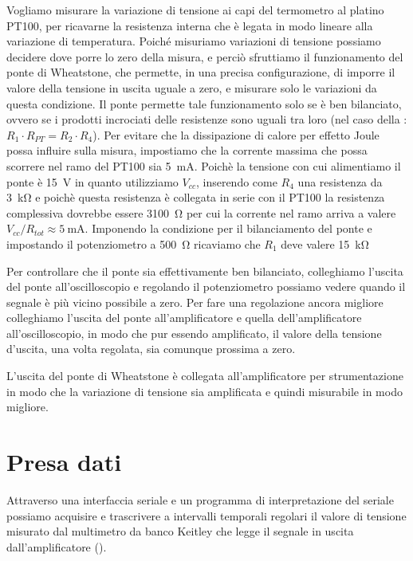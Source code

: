\documentclass[
    rmp,
    reprint, 
    superscriptaddress, 
    altaffilletter, 
    amsmath, 
    amssymb,
    a4paper]{revtex4-2}
\begin{document}
Vogliamo misurare la variazione di tensione ai capi del termometro al platino PT100, per ricavarne la resistenza interna che è legata in modo lineare alla variazione di temperatura. Poiché misuriamo variazioni di tensione possiamo decidere dove porre lo zero della misura, e perciò sfruttiamo il funzionamento del ponte di Wheatstone, che permette, in una precisa configurazione, di imporre il valore della tensione in uscita uguale a zero, e misurare solo le variazioni da questa condizione. Il ponte permette tale funzionamento solo se è ben bilanciato, ovvero se i prodotti incrociati delle resistenze sono uguali tra loro (nel caso della : $R_1\cdot R_{PT}=R_2\cdot R_4$). Per evitare che la dissipazione di calore per effetto Joule possa influire sulla misura, impostiamo che la corrente massima che possa scorrere nel ramo del PT100 sia \SI{5}{\milli\ampere}. Poichè la tensione con cui alimentiamo il ponte è \SI{15}{\volt} in quanto utilizziamo $V_{cc}$, inserendo come $R_4$ una resistenza da \SI{3}{\kilo\ohm} e poichè questa resistenza è collegata in serie con il PT100 la resistenza complessiva dovrebbe essere \SI{3100}{\ohm} per cui la corrente nel ramo arriva a valere $V_{cc}/R_{tot}\approx\SI{5}{\milli\ampere}$. Imponendo la condizione per il bilanciamento del ponte e impostando il potenziometro a \SI{500}{\ohm} ricaviamo che $R_1$ deve valere \SI{15}{\kilo\ohm} 

Per controllare che il ponte sia effettivamente ben bilanciato, colleghiamo l'uscita del ponte all'oscilloscopio e regolando il potenziometro possiamo vedere quando il segnale è più vicino possibile a zero. Per fare una regolazione ancora migliore colleghiamo l'uscita del ponte all'amplificatore e quella dell'amplificatore all'oscilloscopio, in modo che pur essendo amplificato, il valore della tensione d'uscita, una volta regolata, sia comunque prossima a zero.

L'uscita del ponte di Wheatstone è collegata all'amplificatore per strumentazione in modo che la variazione di tensione sia amplificata e quindi misurabile in modo migliore. 


\section*{Presa dati}
Attraverso una interfaccia seriale e un programma di interpretazione del seriale possiamo acquisire e trascrivere a intervalli temporali regolari il valore di tensione misurato dal multimetro da banco Keitley che legge il segnale in uscita dall'amplificatore ().
\end{document}
